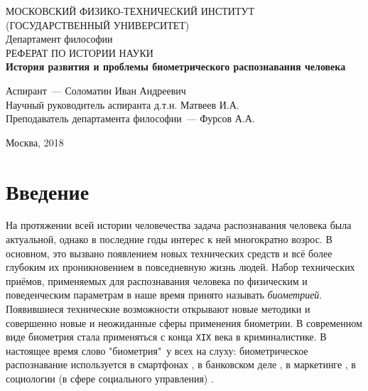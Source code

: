 \documentclass[14pt, a4paper]{extarticle}
\begin{document}
	\begin{titlepage}
		\begin{center}
			\hfill \break
			МОСКОВСКИЙ ФИЗИКО-ТЕХНИЧЕСКИЙ ИНСТИТУТ\\ (ГОСУДАРСТВЕННЫЙ УНИВЕРСИТЕТ)\\
			\hfill \break
			\hfill \break
			\hfill \break
			\hfill \break
			\hfill \break
			Департамент философии\\
			\hfill \break
			\hfill \break
			РЕФЕРАТ ПО ИСТОРИИ НАУКИ\\
			\hfill \break
			\hfill \break
			\large{\textbf{История развития и проблемы биометрического распознавания человека}}\\
			\hfill \break		
		\end{center}
		
		\begin{center}
			\hfill \break
			\parbox{0.9\textwidth}
			{
				Аспирант~--- Соломатин Иван Андреевич \\
				Научный руководитель аспиранта \underline{\hspace{3cm}} д.т.н. Матвеев И.А. \\
				Преподаватель департамента философии~--- Фурсов А.А. \\
			}
		\end{center}
		\hfill \break
		\hfill \break
		\hfill \break
		\hfill \break
		\begin{center} Москва, 2018 
		\end{center}
		\thispagestyle{empty} 
	\end{titlepage}
	
\tableofcontents
\newpage

\section{Введение}
На протяжении всей истории человечества задача распознавания человека была актуальной, однако в последние годы интерес к ней многократно возрос. В основном, это вызвано появлением новых технических средств и всё более глубоким их проникновением в повседневную жизнь людей. Набор технических приёмов, применяемых для распознавания человека по физическим и поведенческим параметрам в наше время принято называть \textit{биометрией}. Появившиеся технические возможности открывают новые методики и совершенно новые и неожиданные сферы применения биометрии. В современном виде биометрия стала применяться с конца \texttt{XIX} века в криминалистике. В настоящее время слово "биометрия"\ у всех на слуху: биометрическое распознавание используется в смартфонах \cite{odinokikh2018high, sezan2014user, hwang2009keystroke}, в банковском деле \cite{fatima2011banking, venkatraman2008biometrics}, в маркетинге \cite{},
в социологии (в сфере социального управления) \cite{}.
\end{document}
